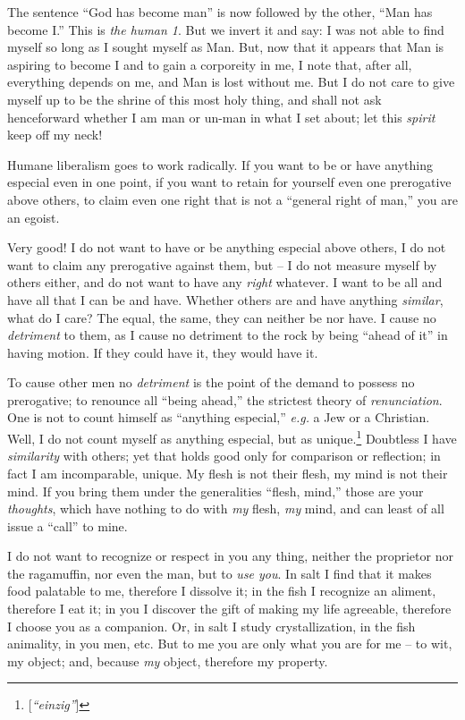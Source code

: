\documentclass[12pt,a4paper]{book}
\begin{document}
The sentence ``God has become man'' is now followed by the other, ``Man has 
become I.'' This is \textit{the human 1}. But we invert it and say: I was not 
able to find myself so long as I sought myself as Man. But, now that it 
appears that Man is aspiring to become I and to gain a corporeity in me, I 
note that, after all, everything depends on me, and Man is lost without me. 
But I do not care to give myself up to be the shrine of this most holy thing, 
and shall not ask henceforward whether I am man or un-man in what I set about; 
let this \textit{spirit} keep off my neck!

Humane liberalism goes to work radically. If you want to be or have anything 
especial even in one point, if you want to retain for yourself even one 
prerogative above others, to claim even one right that is not a ``general 
right of man,'' you are an egoist.

Very good! I do not want to have or be anything especial above others, I do 
not want to claim any prerogative against them, but -- I do not measure myself 
by others either, and do not want to have any \textit{right} whatever. I want 
to be all and have all that I can be and have. Whether others are and have 
anything \textit{similar}, what do I care? The equal, the same, they can 
neither be nor have. I cause no \textit{detriment} to them, as I cause no 
detriment to the rock by being ``ahead of it'' in having motion. If they 
could have it, they would have it.

To cause other men no \textit{detriment} is the point of the demand to possess 
no prerogative; to renounce all ``being ahead,'' the strictest theory of 
\textit{renunciation}. One is not to count himself as ``anything especial,'' 
\textit{e.g.} a Jew or a Christian. Well, I do not count myself as anything 
especial, but as unique.\footnote{[\textit{``einzig''}]} Doubtless I have 
\textit{similarity} with others; yet that holds good only for comparison or 
reflection; in fact I am incomparable, unique. My flesh is not their flesh, my 
mind is not their mind. If you bring them under the generalities ``flesh, 
mind,'' those are your \textit{thoughts}, which have nothing to do with 
\textit{my} flesh, \textit{my} mind, and can least of all issue a ``call'' 
to mine.

I do not want to recognize or respect in you any thing, neither the proprietor 
nor the ragamuffin, nor even the man, but to \textit{use you}. In salt I find 
that it makes food palatable to me, therefore I dissolve it; in the fish I 
recognize an aliment, therefore I eat it; in you I discover the gift of making 
my life agreeable, therefore I choose you as a companion. Or, in salt I study 
crystallization, in the fish animality, in you men, etc. But to me you are 
only what you are for me -- to wit, my object; and, because \textit{my} 
object, therefore my property.
\end{document}
